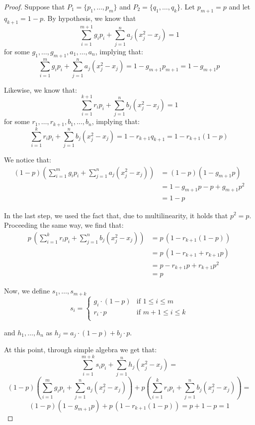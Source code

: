 \documentclass[12pt]{article}
\theoremstyle{definition}
\begin{document}
    \begin{proof}
        Suppose that $P_1 = \{p_1, \ldots, p_m\}$ and $P_2 = \{q_1, \ldots, q_k\}$. Let $p_{m+1} = p$ and let $q_{k+1} = 1-p$. By hypothesis, we know that
        \[\sum_{i = 1}^{m+1} g_i p_i + \sum_{j = 1}^n a_j (x_j^2-x_j) = 1\]
        for some $g_1, \ldots, g_{m+1}, a_1, \ldots, a_n$, implying that:
        \[\sum_{i = 1}^{m} g_i p_i + \sum_{j = 1}^n a_j (x_j^2-x_j) = 1 - g_{m+1} p_{m+1} = 1-g_{m+1} p\]
        
        Likewise, we know that:
        \[\sum_{i = 1}^{k+1} r_i p_i + \sum_{j = 1}^n b_j (x_j^2-x_j) = 1\]
        for some $r_1, \ldots, r_{k+1}, b_1, \ldots, b_n$, implying that:
        \[\sum_{i = 1}^{k} r_i p_i + \sum_{j = 1}^n b_j (x_j^2-x_j) = 1-r_{k+1}q_{k+1} = 1-r_{k+1}(1-p)\]

        We notice that:
        \[\begin{split}
            (1-p) \left (\sum_{i = 1}^{m} g_i p_i + \sum_{j = 1}^n a_j (x_j^2-x_j) \right ) &= (1-p)(1-g_{m+1} p) \\
            &= 1-g_{m+1} p - p + g_{m+1} p^2 \\
            &= 1-p 
        \end{split}\]

        In the last step, we used the fact that, due to multilinearity, it holds that $p^2 = p$. Proceeding the same way, we find that:
        \[\begin{split}
            p\, \left (\sum_{i = 1}^{k} r_i p_i + \sum_{j = 1}^n b_j (x_j^2-x_j)  \right ) &= p\,(1-r_{k+1}(1-p)) \\
            &= p \,(1-r_{k+1} + r_{k+1}p) \\
            &= p - r_{k+1} p + r_{k+1} p^2 \\
            &= p 
        \end{split}\]

        Now, we define $s_1, \ldots, s_{m+k}$ 
        \[s_i = \left \{ \begin{array}{ll}
            g_i \cdot (1-p) & \text{if } 1 \leq i \leq m \\
            r_i \cdot p & \text{if } m+1 \leq i \leq k \\
        \end{array} \right .\]
        
        and $h_1, \ldots, h_n$ as $h_j = a_j \cdot (1-p) + b_j \cdot p$.
        
        At this point, through simple algebra we get that:
        \[\sum_{i = 1}^{m+k} s_i p_i + \sum_{j = 1}^n h_j (x_j^2-x_j) =\]
        \[(1-p) \left (\sum_{i = 1}^{m} g_i p_i + \sum_{j = 1}^n a_j (x_j^2-x_j) \right ) + p \left (\sum_{i = 1}^{k} r_i p_i + \sum_{j = 1}^n b_j (x_j^2-x_j)  \right )=\]
        \[(1-p)(1-g_{m+1}p) + p\,(1-r_{k+1}(1-p)) = p + 1- p = 1\]


\end{proof}
\end{document}
